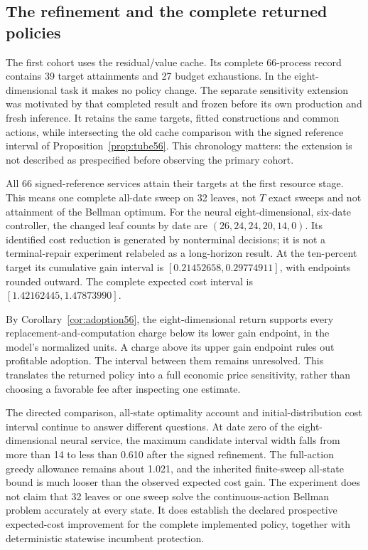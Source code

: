 \subsection{The refinement and the complete returned policies}
The first cohort uses the residual/value cache. Its complete 66-process record contains 39 target attainments and 27 budget exhaustions. In the eight-dimensional task it makes no policy change. The separate sensitivity extension was motivated by that completed result and frozen before its own production and fresh inference. It retains the same targets, fitted constructions and common actions, while intersecting the old cache comparison with the signed reference interval of Proposition~\ref{prop:tube56}. This chronology matters: the extension is not described as prespecified before observing the primary cohort.




All 66 signed-reference services attain their targets at the first resource stage. This means one complete all-date sweep on 32 leaves, not $T$ exact sweeps and not attainment of the Bellman optimum. For the neural eight-dimensional, six-date controller, the changed leaf counts by date are $(26,24,24,20,14,0)$. Its identified cost reduction is generated by nonterminal decisions; it is not a terminal-repair experiment relabeled as a long-horizon result. At the ten-percent target its cumulative gain interval is $[0.21452658,0.29774911]$, with endpoints rounded outward. The complete expected cost interval is $[1.42162445,1.47873990]$.

By Corollary~\ref{cor:adoption56}, the eight-dimensional return supports every replacement-and-computation charge below its lower gain endpoint, in the model's normalized units. A charge above its upper gain endpoint rules out profitable adoption. The interval between them remains unresolved. This translates the returned policy into a full economic price sensitivity, rather than choosing a favorable fee after inspecting one estimate.



The directed comparison, all-state optimality account and initial-distribution cost interval continue to answer different questions. At date zero of the eight-dimensional neural service, the maximum candidate interval width falls from more than 14 to less than 0.610 after the signed refinement. The full-action greedy allowance remains about 1.021, and the inherited finite-sweep all-state bound is much looser than the observed expected cost gain. The experiment does not claim that 32 leaves or one sweep solve the continuous-action Bellman problem accurately at every state. It does establish the declared prospective expected-cost improvement for the complete implemented policy, together with deterministic statewise incumbent protection.

